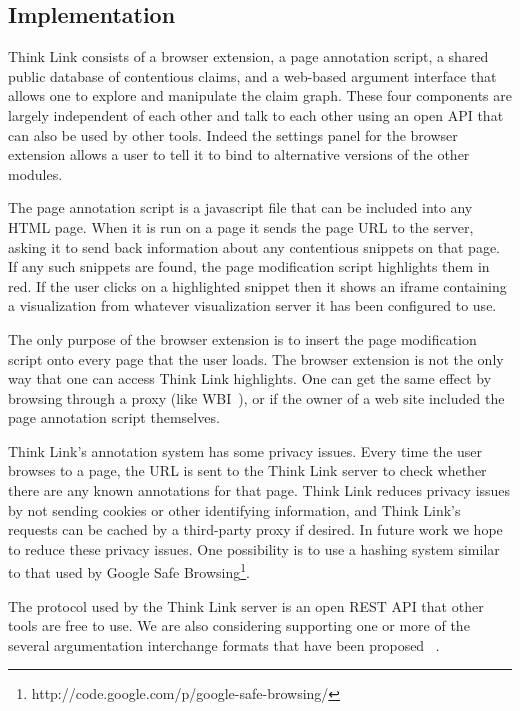 \documentclass{chi2009}
\newcommand{\todo}[1]{}
\begin{document}
\todo{Mention about topic previewing}

\todo{Allow two claims to be marked as being identical.}

\todo{BUG: don't have 'add' button for snippets}


\subsection{Implementation}

Think Link consists of a browser extension, a page annotation script, a shared public database of contentious claims, and a web-based argument interface that allows one to explore and manipulate the claim graph. These four components are largely independent of each other and talk to each other using an open API that can also be used by other tools. Indeed the settings panel for the browser extension allows a user to tell it to bind to alternative versions of the other modules.

The page annotation script is a javascript file that can be included into any HTML page. When it is run on a page it sends the page URL to the server, asking it to send back information about any contentious snippets on that page. If any such snippets are found, the page modification script highlights them in red. If the user clicks on a highlighted snippet then it shows an iframe containing a visualization from whatever visualization server it has been configured to use.

The only purpose of the browser extension is to insert the page modification script onto every page that the user loads. The browser extension is not the only way that one can access Think Link highlights. One can get the same effect by browsing through a proxy (like WBI~\cite{Barrett1997}), or if the owner of a web site included the page annotation script themselves.

Think Link's annotation system has some privacy issues. Every time the user browses to a page, the URL is sent to the Think Link server to check whether there are any known annotations for that page. 
Think Link reduces privacy issues by not sending cookies or other identifying information, and Think Link's requests can be cached by a third-party proxy if desired. 
In future work we hope to reduce these privacy issues. One possibility is to use a hashing system similar to that used by Google Safe Browsing\footnote{http://code.google.com/p/google-safe-browsing/}.

The protocol used by the Think Link server is an open REST API that other tools are free to use. We are also considering supporting one or more of the several argumentation interchange formats that have been proposed ~\cite{Rahwan2007a,McGinnis2007}.
\end{document}
